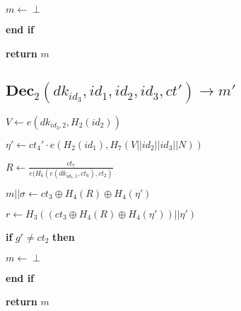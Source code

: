 \documentclass[a4paper]{article}
\begin{document}
	\quad$m \gets \perp$

\textbf{end if}

\textbf{return} $m$

\subsection{$\textbf{Dec}_2(\textit{dk}_{\textit{id}_3}, \textit{id}_1, \textit{id}_2, \textit{id}_3, \textit{ct}') \rightarrow m'$}

$V \gets e(\textit{dk}_{\textit{id}_3, 2}, H_2(\textit{id}_2))$

$\eta' \gets \textit{ct}_4' \cdot e(H_2(\textit{id}_1), H_7(V || \textit{id}_2 || \textit{id}_3 || N))$

$R \gets \frac{\textit{ct}_7}{e(H_6(e(\textit{dk}_{\textit{id}_3, 1}, \textit{ct}_6), \textit{ct}_2)}$

$m || \sigma \gets \textit{ct}_3 \oplus H_4(R) \oplus H_4(\eta')$

$r \gets H_3((\textit{ct}_3 \oplus H_4(R) \oplus H_4(\eta')) || \eta')$

\textbf{if} $g^r \neq \textit{ct}_2$ \textbf{then}

	\quad$m \gets \perp$

\textbf{end if}

\textbf{return} $m$
\end{document}

